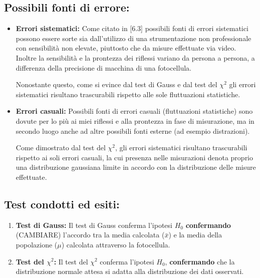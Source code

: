 \documentclass{article}
\begin{document}
\subsection{Possibili fonti di errore:}
\begin{itemize}
	\item \textbf{Errori sistematici:} Come citato in [6.3] possibili fonti di errori sistematici possono essere sorte sia dall'utilizzo di una strumentazione non professionale con sensibilità non elevate, piuttosto che da misure effettuate via video. Inoltre la sensibilità e la prontezza dei riflessi variano da persona a persona, a differenza della precisione di macchina di una fotocellula.
	
	Nonostante questo, come si evince dal test di Gauss e dal test del $\chi^2$ gli errori sistematici risultano trascurabili rispetto alle sole fluttuazioni statistiche.
	
	\item \textbf{Errori casuali:} Possibili fonti di errori casuali (fluttuazioni statistiche) sono dovute per lo più ai miei riflessi e alla prontezza in fase di misurazione, ma in secondo luogo anche ad altre possibili fonti esterne (ad esempio distrazioni).
	
	Come dimostrato dal test del $\chi^2$, gli errori sistematici risultano trascurabili rispetto ai soli errori casuali, la cui presenza nelle misurazioni denota proprio una distribuzione gaussiana limite in accordo con la distribuzione delle misure effettuate.

\end{itemize}

\subsection{Test condotti ed esiti:}
\begin{enumerate}
	\item \textbf{Test di Gauss:} Il test di Gauss conferma l'ipotesi $H_0$ \textbf{confermando} (CAMBIARE) l'accordo tra la media  calcolata ($\bar{x}$) e la media della popolazione ($\mu$) calcolata attraverso la fotocellula.
	\item \textbf{Test del $\chi^2$:} Il test del $\chi^2$ conferma l'ipotesi $H_0$, \textbf{confermando} che la distribuzione normale attesa si adatta alla distribuzione dei dati osservati.
\end{enumerate}
\end{document}
